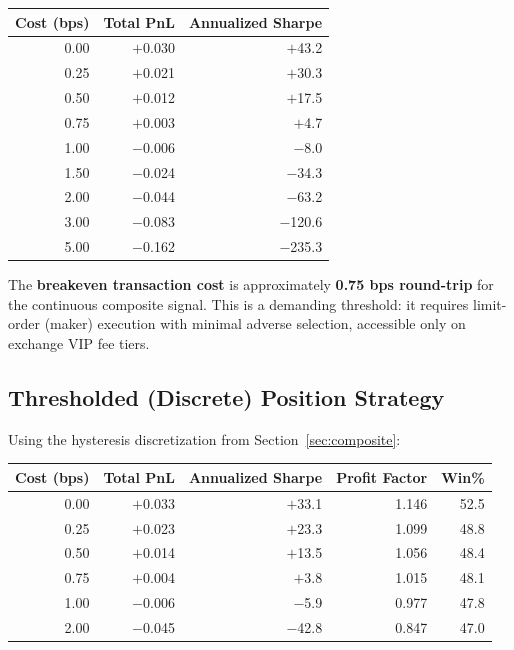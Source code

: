 \documentclass[11pt, a4paper]{article}
\begin{document}
\begin{center}
\begin{tabular}{rrr}
\toprule
\textbf{Cost (bps)} & \textbf{Total PnL} & \textbf{Annualized Sharpe} \\
\midrule
0.00 & $+$0.030 & $+$43.2 \\
0.25 & $+$0.021 & $+$30.3 \\
0.50 & $+$0.012 & $+$17.5 \\
0.75 & $+$0.003 & $+$4.7  \\
1.00 & $-$0.006 & $-$8.0  \\
1.50 & $-$0.024 & $-$34.3 \\
2.00 & $-$0.044 & $-$63.2 \\
3.00 & $-$0.083 & $-$120.6 \\
5.00 & $-$0.162 & $-$235.3 \\
\bottomrule
\end{tabular}
\end{center}

The \textbf{breakeven transaction cost} is approximately \textbf{0.75 bps
round-trip} for the continuous composite signal.  This is a demanding
threshold: it requires limit-order (maker) execution with minimal adverse
selection, accessible only on exchange VIP fee tiers.

\subsection{Thresholded (Discrete) Position Strategy}

Using the hysteresis discretization from Section~\ref{sec:composite}:

\begin{center}
\begin{tabular}{rrrrr}
\toprule
\textbf{Cost (bps)} & \textbf{Total PnL} & \textbf{Annualized Sharpe}
  & \textbf{Profit Factor} & \textbf{Win\%} \\
\midrule
0.00 & $+$0.033 & $+$33.1 & 1.146 & 52.5 \\
0.25 & $+$0.023 & $+$23.3 & 1.099 & 48.8 \\
0.50 & $+$0.014 & $+$13.5 & 1.056 & 48.4 \\
0.75 & $+$0.004 & $+$3.8  & 1.015 & 48.1 \\
1.00 & $-$0.006 & $-$5.9  & 0.977 & 47.8 \\
2.00 & $-$0.045 & $-$42.8 & 0.847 & 47.0 \\
\bottomrule
\end{tabular}
\end{center}
\end{document}

